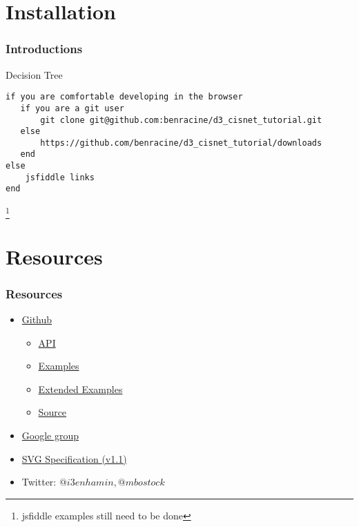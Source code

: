 \documentclass{beamer}
\begin{document}
\section{Installation}


\begin{frame}[fragile]
    \frametitle{Introductions}
    \begin{block}{Decision Tree}
        \tiny{
        \begin{verbatim}
if you are comfortable developing in the browser
   if you are a git user
       git clone git@github.com:benracine/d3_cisnet_tutorial.git
   else
       https://github.com/benracine/d3_cisnet_tutorial/downloads
   end
else
    jsfiddle links
end
        \end{verbatim}
        }
    \end{block}
    \footnote{jsfiddle examples still need to be done}
\end{frame}


\section{Resources}


\begin{frame}
    \frametitle{Resources}
        \begin{itemize}
        \item \href{http://mbostock.github.com/d3/}{Github}
            \begin{itemize}
            \item \href{https://github.com/mbostock/d3/wiki/API-Reference}{API}
            \item \href{http://mbostock.github.com/d3/ex/}{Examples}
            \item \href{}{Extended Examples}
            \item \href{https://github.com/mbostock/d3.git}{Source}
            \end{itemize}
        \item \href{http://groups.google.com/group/d3-js?pli=1}{Google group}
        \item \href{http://www.w3.org/TR/SVG/}{SVG Specification (v1.1)}
        \item Twitter: $@i3enhamin, @mbostock$
        \end{itemize}
\end{frame}
\end{document}
